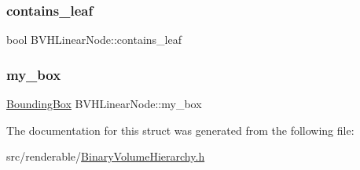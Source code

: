 \mbox{\label{structBVHLinearNode_aabfe3d3f0fa2893fbaa60629baea3cda}} 
\subsubsection{\texorpdfstring{contains\_leaf}{contains\_leaf}}
{\footnotesize\ttfamily bool B\+V\+H\+Linear\+Node\+::contains\+\_\+leaf}

\mbox{\label{structBVHLinearNode_abd02379045550966cdc50a20ea877fa5}} 
\subsubsection{\texorpdfstring{my\_box}{my\_box}}
{\footnotesize\ttfamily \mbox{\hyperlink{classBoundingBox}{Bounding\+Box}} B\+V\+H\+Linear\+Node\+::my\+\_\+box}



The documentation for this struct was generated from the following file\+:\begin{DoxyCompactItemize}
\item 
src/renderable/\mbox{\hyperlink{BinaryVolumeHierarchy_8h}{Binary\+Volume\+Hierarchy.\+h}}\end{DoxyCompactItemize}
